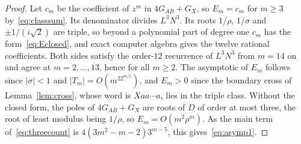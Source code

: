 \begin{proof}
Let $c_m$ be the coefficient of $z^m$ in $4G_{AB}+G_X$, so $E_m=c_m$ for $m\ge3$ by~\eqref{eq:classsum}. Its denominator
divides $L^3N^3$. Its roots $1/\rho$, $1/\sigma$ and $\pm1/(i\sqrt2)$ are triple, so beyond a
polynomial part of degree one $c_m$ has the form~\eqref{eq:Eclosed}, and exact computer algebra
gives the twelve rational coefficients. Both sides satisfy the order-$12$ recurrence of
$L^3N^3$ from $m=14$ on and agree at $m=2,\dots,13$, hence for all $m\ge2$. The asymptotic of $E_m$ follows since
$|\sigma|<1$ and $|T_m|=O(m^22^{m/2})$, and $E_m>0$ since the boundary cross of
Lemma~\ref{lem:cross}, whose word is $Xaa\cdots a$, lies in the triple class. Without the closed form, the poles of $4G_{AB}+G_X$ are roots of $D$ of order at most three, the root of least modulus being $1/\rho$, so $E_m=O(m^2\rho^m)$. As the main term of~\eqref{eq:threecount} is $4(3m^2-m-2)3^{m-5}$, this gives~\eqref{eq:asymp1}.
\end{proof}

